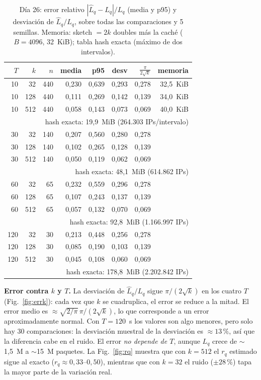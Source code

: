 \documentclass[conference]{IEEEtran}
\newcommand{\Lh}{\hat L}
\begin{document}
\begin{table}[t]
\centering
\caption{Día 26: error relativo $|\Lh_q-L_q|/L_q$ (media y p95) y desviación de $\Lh_q/L_q$, sobre todas las comparaciones y 5 semillas. Memoria: sketch $=2k$ doubles más la caché ($B=4096$, 32~KiB); tabla hash exacta (máximo de dos intervalos).}
\label{tab:act21}
\setlength{\tabcolsep}{3.5pt}
\begin{tabular}{rrrrrrrr}
\toprule
$T$ & $k$ & $n$ & media & p95 & desv & $\frac{\pi}{2\sqrt k}$ & memoria \\
\midrule
10 & 32 & 440 & 0,230 & 0,639 & 0,293 & 0,278 & 32,5~KiB\\
10 & 128 & 440 & 0,111 & 0,269 & 0,142 & 0,139 & 34,0~KiB\\
10 & 512 & 440 & 0,058 & 0,143 & 0,073 & 0,069 & 40,0~KiB\\
\multicolumn{8}{r}{hash exacta: 19,9~MiB (264.303 IPs/intervalo)}\\
30 & 32 & 140 & 0,207 & 0,560 & 0,280 & 0,278 & \\
30 & 128 & 140 & 0,102 & 0,265 & 0,128 & 0,139 & \\
30 & 512 & 140 & 0,050 & 0,119 & 0,062 & 0,069 & \\
\multicolumn{8}{r}{hash exacta: 48,1~MiB (614.862 IPs)}\\
60 & 32 & 65 & 0,232 & 0,559 & 0,296 & 0,278 & \\
60 & 128 & 65 & 0,107 & 0,243 & 0,137 & 0,139 & \\
60 & 512 & 65 & 0,057 & 0,132 & 0,070 & 0,069 & \\
\multicolumn{8}{r}{hash exacta: 92,8~MiB (1.166.997 IPs)}\\
120 & 32 & 30 & 0,213 & 0,448 & 0,256 & 0,278 & \\
120 & 128 & 30 & 0,085 & 0,190 & 0,103 & 0,139 & \\
120 & 512 & 30 & 0,045 & 0,108 & 0,060 & 0,069 & \\
\multicolumn{8}{r}{hash exacta: 178,8~MiB (2.202.842 IPs)}\\
\bottomrule
\end{tabular}
\end{table}

\textbf{Error contra $k$ y $T$.} La desviación de $\Lh_q/L_q$ sigue $\pi/(2\sqrt k)$ en los cuatro $T$ (Fig.~\ref{fig:errk}): cada vez que $k$ se cuadruplica, el error se reduce a la mitad. El error medio es $\approx\sqrt{2/\pi}\,\pi/(2\sqrt k)$, lo que corresponde a un error aproximadamente normal. Con $T=120$~s los valores son algo menores, pero solo hay 30 comparaciones: la desviación muestral de la desviación es $\approx 13\,\%$, así que la diferencia cabe en el ruido. El error \emph{no depende de $T$}, aunque $L_q$ crece de $\sim$1,5~M a $\sim$15~M paquetes. La Fig.~\ref{fig:rq} muestra que con $k=512$ el $r_q$ estimado sigue al exacto ($r_q\approx0{,}33$--$0{,}50$), mientras que con $k=32$ el ruido ($\pm28\,\%$) tapa la mayor parte de la variación real.
\end{document}
